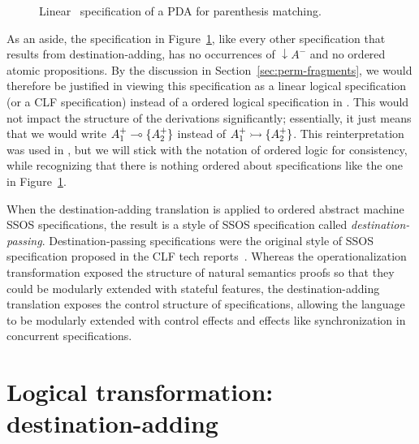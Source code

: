 \begin{figure}
\caption{Linear \sls~specification of a PDA for parenthesis matching.}
\label{fig:pda-lin}
\end{figure}

As an aside, the specification in Figure~\ref{fig:pda-lin}, like every
other specification that results from destination-adding, has no
occurrences of ${\downarrow}A^-$ and no ordered atomic propositions. By
the discussion in Section~\ref{sec:perm-fragments}, we would therefore
be justified in viewing this specification as a linear logical
specification (or a CLF specification) instead of a ordered logical
specification in \sls.  This would not impact the structure of the
derivations significantly; essentially, it just means that we would
write $A^+_1 \multimap \{ A^+_2 \}$ instead of $A^+_1 \rightarrowtail \{ A^+_2
\}$.  This reinterpretation was used in \cite{simmons11logical}, but
we will stick with the notation of ordered logic for consistency,
while recognizing that there is nothing ordered
about specifications like the one in Figure~\ref{fig:pda-lin}. 

When the destination-adding translation is applied to ordered abstract
machine SSOS specifications, the result is a style of SSOS
specification called {\it destination-passing}. Destination-passing
specifications were the original style of SSOS specification proposed
in the CLF tech reports~\cite{cervesato02concurrent}. Whereas the
operationalization transformation exposed the structure of natural
semantics proofs so that they could be modularly extended with
stateful features, the destination-adding translation exposes the
control structure of specifications, allowing the language to be
modularly extended with control effects and effects like
synchronization in concurrent specifications.

\section{Logical transformation: destination-adding}
\label{sec:destination-adding}

